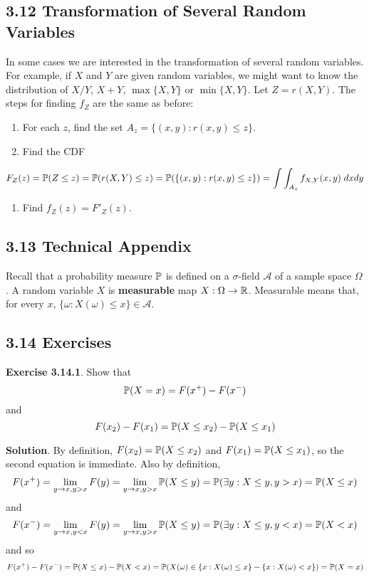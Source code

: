 \subsection*{3.12 Transformation of Several Random
Variables}\label{transformation-of-several-random-variables}
In some cases we are interested in the transformation of several random
variables. For example, if \(X\) and \(Y\) are given random variables,
we might want to know the distribution of \(X / Y\), \(X + Y\),
\(\max \{ X, Y \}\) or \(\min \{ X, Y \}\). Let \(Z = r(X, Y)\). The
steps for finding \(f_Z\) are the same as before:
\begin{enumerate}[tightlist,label={\arabic*.}]
\item
  For each \(z\), find the set \(A_z = \{ (x, y) : r(x, y) \leq z \}\).
\item
  Find the CDF
\end{enumerate}
\[
F_Z(z) = \operatorname{\mathbb{P}}(Z \leq z) = \operatorname{\mathbb{P}}(r(X, Y) \leq z) = \operatorname{\mathbb{P}}(\{ (x, y) : r(x, y) \leq z \})
  = \int \int_{A_z} f_{X, Y}(x, y) \; dx dy 
\]
\begin{enumerate}[tightlist,label={\arabic*.},resume]
\item
  Find \(f_Z(z) = F'_Z(z)\).
\end{enumerate}

\subsection*{3.13 Technical Appendix}
Recall that a probability measure \(\operatorname{\mathbb{P}}\) is defined on a
\(\sigma\)-field \(\mathcal{A}\) of a sample space \(\Omega\). A random
variable \(X\) is \textbf{measurable} map
\(X : \Omega \rightarrow \mathbb{R}\). Measurable means that, for every
\(x\), $\{ \omega : X(\omega) \leq x \} \in \mathcal{A} $.

\subsection*{3.14 Exercises}

\textbf{Exercise 3.14.1}. Show that
\[
\operatorname{\mathbb{P}}(X = x) = F(x^+) - F(x^-)
\]
and
\[
F(x_{2}) - F(x_{1}) = \operatorname{\mathbb{P}}(X \leq x_{2}) - \operatorname{\mathbb{P}}(X \leq x_{1})
\]

\textbf{Solution}.
By definition, \(F(x_{2}) = \operatorname{\mathbb{P}}(X \leq x_{2})\) and
\(F(x_{1}) = \operatorname{\mathbb{P}}(X \leq x_{1})\), so the second equation is
immediate.
Also by definition,
\[
F(x^+) = \lim_{y \rightarrow x, y > x} F(y) = \lim_{y \rightarrow x, y > x} \operatorname{\mathbb{P}}(X \leq y) 
= \operatorname{\mathbb{P}}(\exists y : X \leq y, y > x) 
= \operatorname{\mathbb{P}}(X \leq x)
\]
and
\[
F(x^-) = \lim_{y \rightarrow x, y < x} F(y) = \lim_{y \rightarrow x, y > x} \operatorname{\mathbb{P}}(X \leq y) 
= \operatorname{\mathbb{P}}(\exists y : X \leq y, y < x)
= \operatorname{\mathbb{P}}(X < x)
\]
and so
\[
F(x^+) - F(x^-) = \operatorname{\mathbb{P}}(X \leq x) - \operatorname{\mathbb{P}}(X < x) = \operatorname{\mathbb{P}}(X(\omega) \in \{x : X(\omega) \leq x \} - \{x: X(\omega) < x \}) = \operatorname{\mathbb{P}}(X = x)
\]


